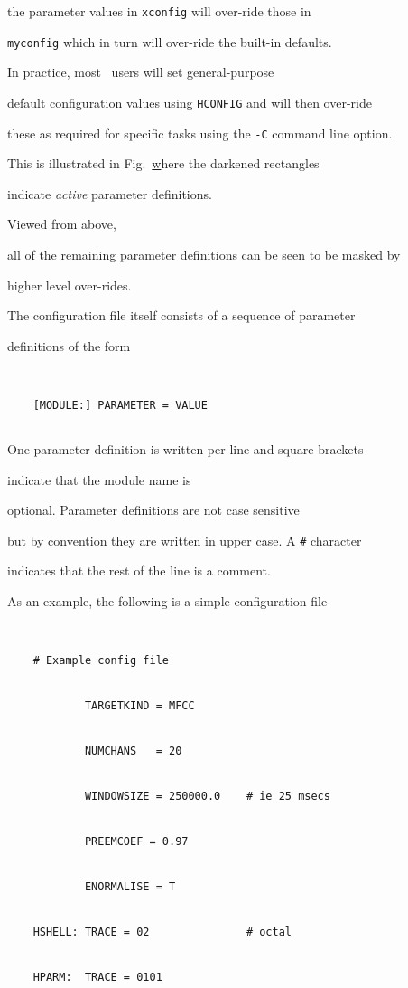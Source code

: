 the parameter values in \texttt{xconfig} will over-ride those in 


\texttt{myconfig} which in turn will over-ride the built-in defaults.


In practice, most \HTK\ users will set general-purpose


default configuration values using \texttt{HCONFIG} and will then over-ride


these as required for specific tasks using the \texttt{-C} command line option.


This is illustrated in Fig.~\href{f:Config} where the darkened rectangles


indicate \textit{active} parameter definitions.


Viewed from above, 


all of the remaining parameter definitions can be seen to be masked by


higher level over-rides.





The configuration file itself consists of a sequence of parameter


definitions of the form


\begin{verbatim}


    [MODULE:] PARAMETER = VALUE


\end{verbatim}


One parameter definition is written per line and square brackets


indicate that the module name is


optional. Parameter definitions are not case sensitive


but by convention they are written in upper case.  A \verb+#+ character 


indicates that the rest of the line is a comment.





As an example, the following is a simple configuration file


\begin{verbatim}


    # Example config file


            TARGETKIND = MFCC


            NUMCHANS   = 20


            WINDOWSIZE = 250000.0    # ie 25 msecs


            PREEMCOEF = 0.97


            ENORMALISE = T


    HSHELL: TRACE = 02               # octal


    HPARM:  TRACE = 0101


\end{verbatim}


